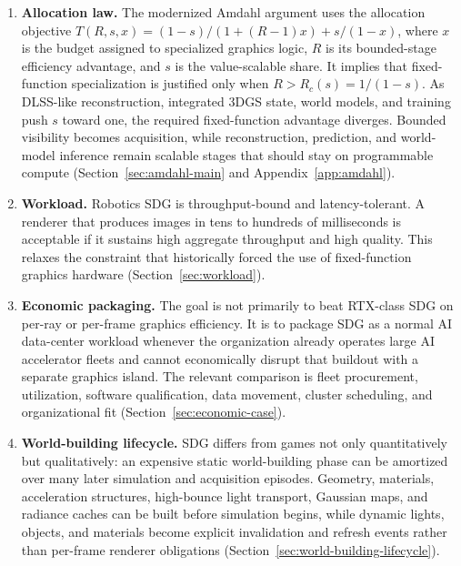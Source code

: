 \documentclass[10pt,journal,onecolumn]{IEEEtran}
\begin{document}
\begin{enumerate}
    \item \textbf{Allocation law.} The modernized Amdahl argument uses the
    allocation objective
    $T(R,s,x)=(1-s)/(1+(R-1)x)+s/(1-x)$, where $x$ is the budget assigned to
    specialized graphics logic, $R$ is its bounded-stage efficiency advantage,
    and $s$ is the value-scalable share. It implies that fixed-function
    specialization is justified only when $R>R_c(s)=1/(1-s)$. As DLSS-like
    reconstruction, integrated 3DGS state, world models, and training push $s$
    toward one, the required fixed-function advantage diverges. Bounded
    visibility becomes acquisition, while reconstruction, prediction, and
    world-model inference remain scalable stages that should stay on
    programmable compute (Section~\ref{sec:amdahl-main} and
    Appendix~\ref{app:amdahl}).

    \item \textbf{Workload.} Robotics SDG is throughput-bound and
    latency-tolerant. A renderer that produces images in tens to hundreds
    of milliseconds is acceptable if it sustains high aggregate throughput
    and high quality. This relaxes the constraint that historically
    forced the use of fixed-function graphics hardware
    (Section~\ref{sec:workload}).

    \item \textbf{Economic packaging.} The goal is not primarily to beat
    RTX-class SDG on per-ray or per-frame graphics efficiency. It is to package
    SDG as a normal AI data-center workload whenever the organization already
    operates large AI accelerator fleets and cannot economically disrupt that
    buildout with a separate graphics island. The relevant comparison is fleet
    procurement, utilization, software qualification, data movement, cluster
    scheduling, and organizational fit (Section~\ref{sec:economic-case}).

    \item \textbf{World-building lifecycle.} SDG differs from games not only
    quantitatively but qualitatively: an expensive static world-building phase
    can be amortized over many later simulation and acquisition episodes.
    Geometry, materials, acceleration structures, high-bounce light transport,
    Gaussian maps, and radiance caches can be built before simulation begins,
    while dynamic lights, objects, and materials become explicit invalidation
    and refresh events rather than per-frame renderer obligations
    (Section~\ref{sec:world-building-lifecycle}).


\end{enumerate}
\end{document}
